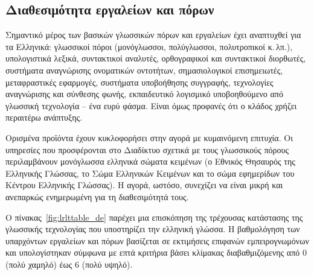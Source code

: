 \documentclass[]{../../metanetpaper}
\begin{document}
\begin{multicols}{2}
\subsection{Διαθεσιμότητα εργαλείων και πόρων}

Σημαντικό μέρος των βασικών  γλωσσικών πόρων και εργαλείων έχει αναπτυχθεί για τα Ελληνικά: γλωσσικοί πόροι (μονόγλωσσοι, πολύγλωσσοι, πολυτροπικοί κ.\,λπ.), υπολογιστικά λεξικά, συντακτικοί αναλυτές, ορθογραφικοί και συντακτικοί διορθωτές, συστήματα αναγνώρισης ονοματικών οντοτήτων, σημασιολογικοί επισημειωτές, μεταφραστικές εφαρμογές, συστήματα υποβοήθησης συγγραφής, τεχνολογίες αναγνώρισης και σύνθεσης φωνής, εκπαιδευτικό λογισμικό υποβοηθούμενο από γλωσσική τεχνολογία – ένα ευρύ φάσμα. Είναι όμως προφανές ότι ο κλάδος χρήζει περαιτέρω ανάπτυξης.

Ορισμένα προϊόντα έχουν κυκλοφορήσει στην αγορά με κυμαινόμενη επιτυχία. Οι υπηρεσίες που προσφέρονται στο Διαδίκτυο σχετικά με τους γλωσσικούς πόρους περιλαμβάνουν μονόγλωσσα ελληνικά σώματα κειμένων (ο Εθνικός Θησαυρός της Ελληνικής Γλώσσας, το Σώμα Ελληνικών Κειμένων και το σώμα εφημερίδων του Κέντρου Ελληνικής Γλώσσας). Η αγορά, ωστόσο, συνεχίζει να είναι μικρή και ανεπαρκώς ενημερωμένη για τη διαθεσιμότητά τους.

Ο πίνακας~\ref{fig:lrlttable_de} παρέχει μια επισκόπηση της τρέχουσας κατάστασης της γλωσσικής τεχνολογίας που υποστηρίζει την ελληνική γλώσσα. Η βαθμολόγηση των υπαρχόντων εργαλείων και πόρων βασίζεται σε εκτιμήσεις επιφανών εμπειρογνωμόνων και υπολογίστηκαν σύμφωνα με επτά κριτήρια βάσει κλίμακας διαβαθμιζόμενης από 0 (πολύ χαμηλό) έως 6 (πολύ υψηλό).


\end{multicols}
\end{document}
